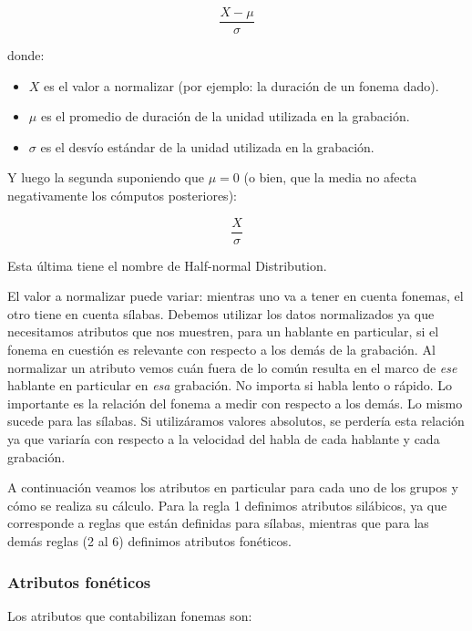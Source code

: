 \hspace{2cm} \[\frac{ X - \mu }{ \sigma }\]

\noindent donde:

\begin{itemize}
	\item $X$ es el valor a normalizar (por ejemplo: la duración de un fonema dado).
	\item $\mu$ es el promedio de duración de la unidad utilizada en la grabación.
	\item $\sigma$ es el desvío estándar de la unidad utilizada en la grabación.
\end{itemize}

\noindent Y luego la segunda suponiendo que $\mu = 0$ (o bien, que la media no afecta negativamente los cómputos posteriores):

\hspace{2cm} \[\frac{ X }{ \sigma }\]

\noindent Esta última tiene el nombre de Half-normal Distribution.

El valor a normalizar puede variar: mientras uno va a tener en cuenta fonemas, el otro tiene en cuenta sílabas. Debemos utilizar los datos normalizados ya que necesitamos atributos que nos muestren, para un hablante en particular, si el fonema en cuestión es relevante con respecto a los demás de la grabación. Al normalizar un atributo vemos cuán fuera de lo común resulta en el marco de \textit{ese} hablante en particular en \textit{esa} grabación. No importa si habla lento o rápido. Lo importante es la relación del fonema a medir con respecto a los demás. Lo mismo sucede para las sílabas. Si utilizáramos valores absolutos, se perdería esta relación ya que variaría con respecto a la velocidad del habla de cada hablante y cada grabación.
 
A continuación veamos los atributos en particular para cada uno de los grupos y cómo se realiza su cálculo. Para la regla 1 definimos atributos silábicos, ya que corresponde a reglas que están definidas para sílabas, mientras que para las demás reglas (2 al 6) definimos atributos fonéticos.

\subsubsection{Atributos fonéticos}

Los atributos que contabilizan fonemas son:

